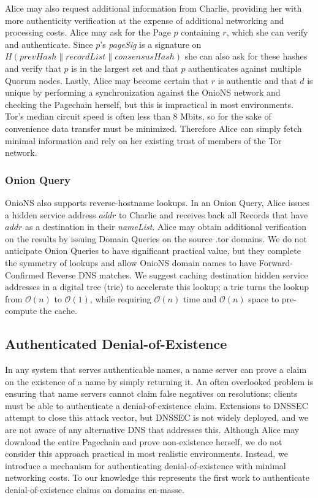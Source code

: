 \documentclass{sig-alternate}
\newcommand*\concat{\mathbin{\|}}
\begin{document}
Alice may also request additional information from Charlie, providing her with more authenticity verification at the expense of additional networking and processing costs. Alice may ask for the Page $ p $ containing $ r $, which she can verify and authenticate. Since $ p $'s \emph{pageSig} is a signature on $ H(\mathit{prevHash} \concat \mathit{recordList} \concat \mathit{consensusHash}) $ she can also ask for these hashes and verify that $ p $ is in the largest set and that $ p $ authenticates against multiple Quorum nodes. Lastly, Alice may become certain that $ r $ is authentic and that $ d $ is unique by performing a synchronization against the OnioNS network and checking the Pagechain herself, but this is impractical in most environments. Tor's median circuit speed is often less than 8 Mbits,\cite{TorMetrics} so for the sake of convenience data transfer must be minimized. Therefore Alice can simply fetch minimal information and rely on her existing trust of members of the Tor network.

\subsubsection{Onion Query} %

OnioNS also supports reverse-hostname lookups. In an Onion Query, Alice issues a hidden service address $ \mathit{addr} $ to Charlie and receives back all Records that have $ \mathit{addr} $ as a destination in their \emph{nameList}. Alice may obtain additional verification on the results by issuing Domain Queries on the source .tor domains. We do not anticipate Onion Queries to have significant practical value, but they complete the symmetry of lookups and allow OnioNS domain names to have Forward-Confirmed Reverse DNS matches. We suggest caching destination hidden service addresses in a digital tree (trie) to accelerate this lookup; a trie turns the lookup from $ \mathcal{O}(n) $ to $ \mathcal{O}(1) $, while requiring $ \mathcal{O}(n) $ time and $ \mathcal{O}(n) $ space to pre-compute the cache.

\subsection{Authenticated Denial-of-Existence}

In any system that serves authenticable names, a name server can prove a claim on the existence of a name by simply returning it. An often overlooked problem is ensuring that name servers cannot claim false negatives on resolutions; clients must be able to authenticate a denial-of-existence claim. Extensions to DNSSEC attempt to close this attack vector, but DNSSEC is not widely deployed, and we are not aware of any alternative DNS that addresses this. Although Alice may download the entire Pagechain and prove non-existence herself, we do not consider this approach practical in most realistic environments. Instead, we introduce a mechanism for authenticating denial-of-existence with minimal networking costs. To our knowledge this represents the first work to authenticate denial-of-existence claims on domains en-masse.
\end{document}
